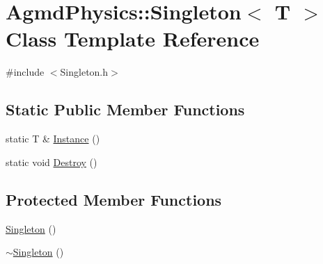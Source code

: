 \hypertarget{class_agmd_physics_1_1_singleton}{\section{Agmd\+Physics\+:\+:Singleton$<$ T $>$ Class Template Reference}
\label{class_agmd_physics_1_1_singleton}
}


{\ttfamily \#include $<$Singleton.\+h$>$}

\subsection*{Static Public Member Functions}
\begin{DoxyCompactItemize}
\item 
static T \& \hyperlink{class_agmd_physics_1_1_singleton_ad5a252c8b0e4baf17315fe6ee902b93f}{Instance} ()
\item 
static void \hyperlink{class_agmd_physics_1_1_singleton_ab58aa1223f8165983b9d69b4b29b6f7e}{Destroy} ()
\end{DoxyCompactItemize}
\subsection*{Protected Member Functions}
\begin{DoxyCompactItemize}
\item 
\hyperlink{class_agmd_physics_1_1_singleton_a66ce26fef4f7ba4d85d144cad20ec201}{Singleton} ()
\item 
\hyperlink{class_agmd_physics_1_1_singleton_a79437371b953ef93f58a7d92e8a7295c}{$\sim$\+Singleton} ()
\end{DoxyCompactItemize}


